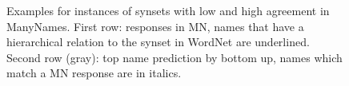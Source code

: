 \begin{figure}[t]
\begin{minipage}[b]{0.5\linewidth}
{\begin{tabular}{p{2.6cm}|p{2.6cm}|p{2.6cm}|p{2.6cm}|p{2.6cm}|p{2.6cm}}
			\end{tabular}
		}
	\end{minipage}
	\caption{Examples for instances of \vgenome synsets with low and high agreement in ManyNames. 
		First row: responses in MN, names that have a hierarchical relation to the \vgenome synset in WordNet are underlined.
	Second row (gray): top name prediction by bottom up, names which match a MN response are in italics.}
	\label{fig:ex-high-low-agreement}
\end{figure}



